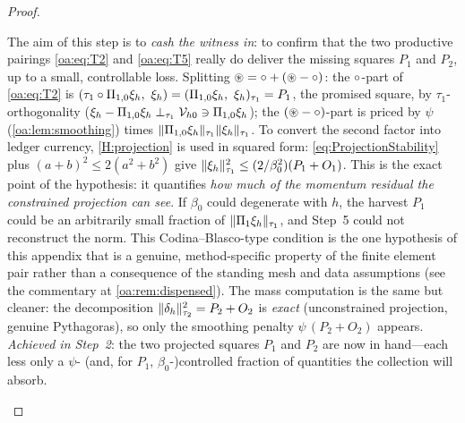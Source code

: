 \begin{proof}
\begin{pedagogy}
The aim of this step is to \emph{cash the witness in}: to confirm that the two
productive pairings \cref{oa:eq:T2} and \cref{oa:eq:T5} really do deliver the
missing squares $P_1$ and $P_2$, up to a small, controllable loss. Splitting
$\circledast = \circ + (\circledast-\circ)$: the $\circ$-part of \cref{oa:eq:T2}
is $(\tau_1\circ\Pi_{1,0}\xi_h,\ \xi_h) = (\Pi_{1,0}\xi_h,\ \xi_h)_{\tau_1} = P_1$,
the promised square, by $\tau_1$-orthogonality
($\xi_h - \Pi_{1,0}\xi_h \perp_{\tau_1} \mathcal{V}_{h0} \ni \Pi_{1,0}\xi_h$); the
$(\circledast-\circ)$-part is priced by $\psi$ (\cref{oa:lem:smoothing}) times
$\lVert \Pi_{1,0}\xi_h \rVert_{\tau_1}\lVert \xi_h \rVert_{\tau_1}$. To convert the second
factor into ledger currency, \cref{H:projection} is used in squared form:
\cref{eq:ProjectionStability} plus $(a+b)^2 \le 2(a^2+b^2)$ give
$\lVert \xi_h \rVert_{\tau_1}^2 \le (2/\beta_0^2)(P_1+O_1)$. This is the exact point
of the hypothesis: it quantifies \emph{how much of the momentum residual the
constrained projection can see}. If $\beta_0$ could degenerate with $h$, the
harvest $P_1$ could be an arbitrarily small fraction of
$\lVert \Pi_{1}\xi_h \rVert_{\tau_1}$, and Step~5 could not reconstruct the norm. This
Codina--Blasco-type condition is the one hypothesis of this appendix that is a
genuine, method-specific property of the finite element pair rather than a
consequence of the standing mesh and data assumptions (see the commentary at
\cref{oa:rem:dispensed}). The mass computation is the same but cleaner: the
decomposition $\lVert \delta_h \rVert_{\tau_2}^2 = P_2 + O_2$ is \emph{exact}
(unconstrained projection, genuine Pythagoras), so only the smoothing penalty
$\psi\,(P_2+O_2)$ appears.
\emph{Achieved in Step~2}: the two projected squares $P_1$ and $P_2$ are now in
hand---each less only a $\psi$- (and, for $P_1$, $\beta_0$-)controlled fraction of
quantities the collection will absorb.
\end{pedagogy}


\end{proof}
